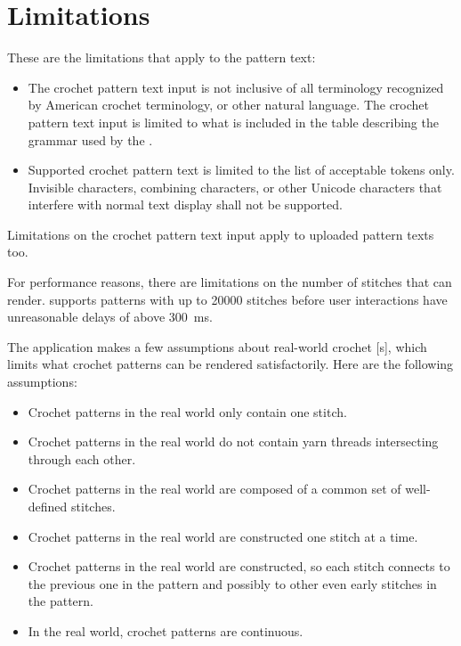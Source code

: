 \documentclass[main.tex]{subfiles}
\begin{document}
\chapter{Limitations}\label{chp:limitations}

These are the limitations that apply to the pattern text:
\begin{itemize}
\item The crochet pattern text input is not inclusive of all terminology recognized by American crochet terminology, or other natural language. The crochet pattern text input is limited to what is included in the table describing the grammar used by the \PTI.
\item Supported crochet pattern text is limited to the list of acceptable tokens only. Invisible characters, combining characters, or other Unicode characters that interfere with normal text display shall not be supported.
\end{itemize}

Limitations on the crochet pattern text input apply to uploaded pattern texts too.

For performance reasons, there are limitations on the number of stitches that \CC{} can render. \CC{} supports patterns with up to \num{20000} stitches before user interactions have unreasonable delays of above \qty{300}{ms}. 

The \CC{} application makes a few assumptions about real-world crochet [s], which limits what crochet patterns can be rendered satisfactorily. Here are the following assumptions:

\begin{itemize}
\item Crochet patterns in the real world only contain one  stitch.
\item Crochet patterns in the real world do not contain yarn threads intersecting through each other.
\item Crochet patterns in the real world are composed of a common set of well-defined stitches.
\item Crochet patterns in the real world are constructed one stitch at a time.
\item Crochet patterns in the real world are constructed, so each stitch connects to the previous one in the pattern and possibly to other even early stitches in the pattern.
\item In the real world, crochet patterns are continuous.
\end{itemize}
\end{document}
